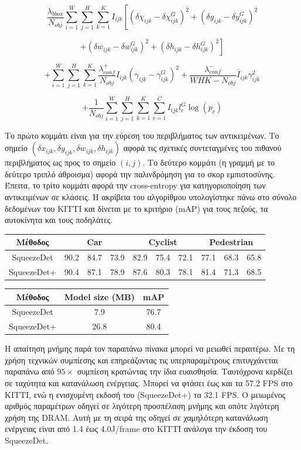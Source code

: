 $$
\frac{\lambda_{bbox}}{N_{obj}} \sum_{i=1}^{W} \sum_{j=1}^{H} \sum_{k=1}^{K} I_{ijk} \left[(\delta\chi_{ijk} - \delta\chi_{ijk}^{G})^2 + ({\delta y}_{ijk} - {\delta y}_{ijk}^{G})^2 \right.
$$

$$
\left. + ({\delta w}_{ijk} - {\delta w}_{ijk}^{G})^2 + ({\delta h}_{ijk} - {\delta h}_{ijk}^{G})^2\right]
$$

$$
+ \sum_{i=1}^{W} \sum_{j=1}^{H} \sum_{k=1}^{K} \frac{\lambda_{conf}^{+}}{N_{obj}} I_{ijk} (\gamma_{ijk} - \gamma_{ijk}^G)^2 + \frac{\lambda_{conf}^{-}}{W H K - N_{obj}} \bar{I}_{ijk}\gamma_{ijk}^{2}
$$

$$
 + \frac{1}{N_{obj}} \sum_{i=1}^{W} \sum_{j=1}^{H} \sum_{k=1}^{K} \sum_{c=1}^{C} I_{ijk}l_{c}^{G}\log(p_c)
$$

Το πρώτο κομμάτι είναι για την εύρεση του περιβλήματος των αντικειμένων. Το σημείο $({\delta x}_{ijk}, {\delta y}_{ijk}, {\delta w}_{ijk}, {\delta h}_{ijk})$ αφορά τις σχετικές συντεταγμένες του πιθανού περιβλήματος ως προς το σημείο $(i,j)$. Το δεύτερο κομμάτι (η γραμμή με το δεύτερο τριπλό άθροισμα) αφορά την παλινδρόμηση για το σκορ εμπιστοσύνης. Έπειτα, το τρίτο κομμάτι αφορά την cross-entropy για κατηγοριοποίηση των αντικειμένων σε κλάσεις.
Η ακρίβεια του αλγορίθμου υπολογίστηκε πάνω στο σύνολο δεδομένων του KITTI και δίνεται με το κριτήριο (mAP) για τους πεζούς, τα αυτοκίνητα και τους ποδηλάτες.

\begin{tabular}{|*{10}{c|}} 
\hline
Μέθοδος & \multicolumn{3}{c|}{Car} & \multicolumn{3}{c|}{Cyclist} & \multicolumn{3}{c|}{Pedestrian}\\
\hline
SqueezeDet & 90.2 & 84.7 & 73.9 & 82.9 & 75.4 & 72.1 & 77.1 & 68.3 & 65.8 \\
SqueezeDet+ & 90.4 & 87.1 & 78.9 & 87.6 & 80.3 & 78.1 & 81.4 & 71.3 & 68.5 \\
\hline
\end{tabular}

\begin{tabular}{|*{3}{c|}}
\hline
Μέθοδος & Model size (MB) & mAP \\
\hline
SqueezeDet & 7.9 & 76.7\\
SqueezeDet+ & 26.8 & 80.4\\
\hline
\end{tabular}

Η απαίτηση μνήμης παρά τον παραπάνω πίνακα μπορεί να μειωθεί περαιτέρω. Με τη χρήση τεχνικών συμπίεσης και επηρεάζοντας τις υπερπαραμέτρους επιτυγχάνεται παραπάνω από $95\times$ συμπίεση κρατώντας την ίδια ευαισθησία. Ταυτόχρονα κερδίζει σε ταχύτητα και κατανάλωση ενέργειας. Μπορεί να φτάσει έως και τα 57.2 FPS στο KITTI, ενώ η ενισχυμένη εκδοσή του (SqueezeDet+) τα 32.1 FPS. Ο μειωμένος αριθμός παραμέτρων οδηγεί σε λιγότερη προσπέλαση μνήμης και οπότε λιγότερη χρήση της DRAM. Αυτή με τη σειρά της οδηγεί σε χαμηλότερη κατανάλωση ενέργειας είναι από 1.4 έως 4.0J/frame στο ΚΙΤΤΙ ανάλογα την έκδοση του SqueezeDet.

